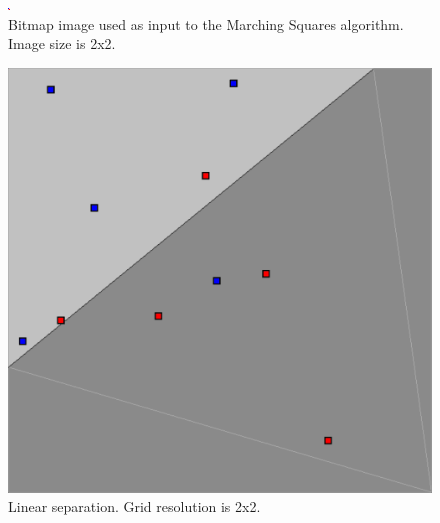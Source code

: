 \documentclass[12pt]{article}
\begin{document}
\begin{figure} 
\centering
  \includegraphics[width = 3 in]{2_res_image.png}
  \caption{Bitmap image used as input to the Marching Squares algorithm.
Image size is 2x2.
}
\end{figure}


\begin{figure} 
\centering
  \includegraphics[width = 3 in]{2_res.png}
  \caption{Linear separation. Grid resolution is 2x2.
}
\end{figure}
\end{document}
